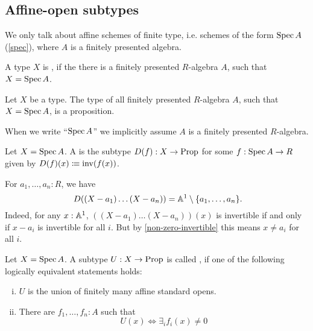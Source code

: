 \subsection{Affine-open subtypes}

We only talk about affine schemes of finite type, i.e. schemes of the form $\operatorname{Spec} A$ (\cref{spec}),
where $A$ is a finitely presented algebra.

\begin{definition}%
  A type $X$ is ,
  if the there is a finitely presented $R$-algebra $A$, such that $X=\operatorname{Spec} A$.
\end{definition}

\begin{proposition}%
  Let $X$ be a type.
  The type of all finitely presented $R$-algebra $A$, such that $X=\operatorname{Spec} A$, is a proposition.
\end{proposition}

When we write ``$\operatorname{Spec} A$'' we implicitly assume $A$ is a finitely presented $R$-algebra.

\begin{definition}%
  Let $X=\operatorname{Spec} A$.
  A  is the subtype $D(f):X\to\mathrm{Prop}$
  for some $f:\operatorname{Spec} A\to R$ given by $D(f)(x)\vcentcolon\mspace{-1.2mu}\equiv \mathrm{inv}(f(x))$.
\end{definition}

\begin{example}
  For $a_1, \dots, a_n : R$, we have
  \[ D((X - a_1) \dots (X - a_n)) = \A^1 \setminus \{ a_1, \dots, a_n \} \rlap{.}\]
  Indeed,
  for any $x : \mathbb{A}^1$,
  $((X - a_1) \dots (X - a_n))(x)$ is invertible if and only if
  $x - a_i$ is invertible for all $i$.
  But by \cref{non-zero-invertible}
  this means $x \neq a_i$ for all $i$.
\end{example}

\begin{definition}%
  \label{affine-open}
  Let $X=\operatorname{Spec} A$.
  A subtype $U:X\to\mathrm{Prop}$ is called ,
  if one of the following logically equivalent statements holds:
  \begin{enumerate}[(i)]%
  \item $U$ is the union of finitely many affine standard opens.
  \item There are $f_1,\dots,f_n:A$ such that
    \[U(x) \Leftrightarrow \exists_{i} f_i(x)\neq 0 \]
  \end{enumerate}
\end{definition}

